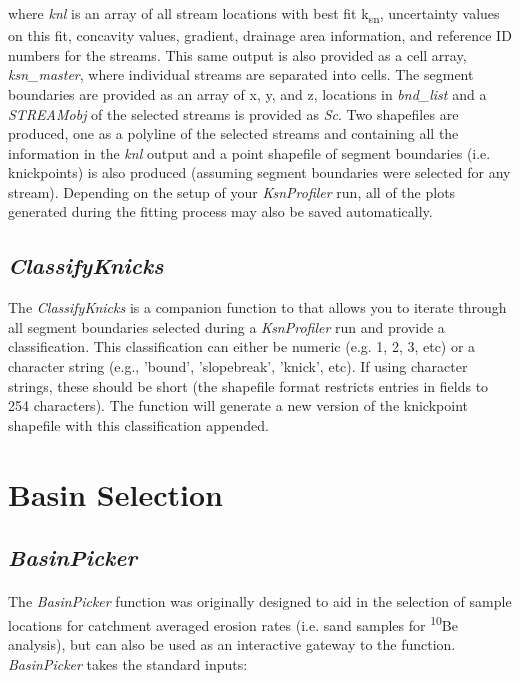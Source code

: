\noindent
 where \textit{knl} is an array of all stream locations with best fit k\textsubscript{sn}, uncertainty values on this fit, concavity values, gradient, drainage area information, and reference ID numbers for the streams. This same output is also provided as a cell array, \textit{ksn\_master}, where individual streams are separated into cells. The segment boundaries are provided as an array of x, y, and z, locations in \textit{bnd\_list} and a \textit{STREAMobj} of the selected streams is provided as \textit{Sc}. Two shapefiles are produced, one as a polyline of the selected streams and containing all the information in the \textit{knl} output and a point shapefile of segment boundaries (i.e. knickpoints) is also produced (assuming segment boundaries were selected for any stream). Depending on the setup of your \textit{KsnProfiler} run, all of the plots generated during the fitting process may also be saved automatically.

\subsection{\textit{ClassifyKnicks}}
The \textit{ClassifyKnicks} is a companion function to  that allows you to iterate through all segment boundaries selected during a \textit{KsnProfiler} run and provide a classification. This classification can either be numeric (e.g. 1, 2, 3, etc) or a character string (e.g., 'bound', 'slopebreak', 'knick', etc). If using character strings, these should be short (the shapefile format restricts entries in fields to 254 characters). The function will generate a new version of the knickpoint shapefile with this classification appended.

\section{Basin Selection}

\subsection{\textit{BasinPicker}} \label{sec:BsnPckr}
\paragraph{}The \textit{BasinPicker} function was originally designed to aid in the selection of sample locations for catchment averaged erosion rates (i.e. sand samples for  \textsuperscript{10}Be analysis), but can also be used as an interactive gateway to the  function. \textit{BasinPicker} takes the standard inputs:

